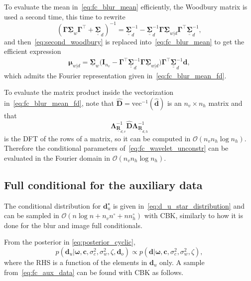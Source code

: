 \documentclass[12pt]{article}
\newcommand{\mycirc}[1] {\underline{\bm{#1}}}
\newcommand{\mybcirc}[1] {\underline{\underline{\bm{#1}}}}
\begin{document}
To evaluate the mean in~\eqref{eq:fc_blur_mean} efficiently, the Woodbury matrix is used a second time, this time to rewrite
\begin{equation} \label{eq:second_woodbury}
(\bm{\Gamma}\mycirc{\Sigma}_w\bm{\Gamma}^{\top}+\mybcirc{\Sigma}_d)^{-1} = \mybcirc{\Sigma}_d^{-1} - \mybcirc{\Sigma}_d^{-1}\bm{\Gamma}\mycirc{\Sigma}_{w|d} \bm{\Gamma}^{\top} \mybcirc{\Sigma}_d^{-1},
\end{equation}
and then~\eqref{eq:second_woodbury} is replaced into~\eqref{eq:fc_blur_mean} to get the efficient expression
\begin{align}
    \bm{\mu}_{w|d} = \mycirc{\Sigma}_w \bigl(\bm{I}_{n_v} - \bm{\Gamma}^{\top} \mybcirc{\Sigma}_d^{-1}\bm{\Gamma}\mycirc{\Sigma}_{w|d}\bigr) \bm{\Gamma}^{\top}\mybcirc{\Sigma}_d^{-1}\bm{d},
\end{align}
which admits the Fourier representation given in~\eqref{eq:fc_blur_mean_fd}.


To evaluate the matrix product inside the vectorization in~\eqref{eq:fc_blur_mean_fd}, note that $\hat{\bm{D}}=\mbox{vec}^{-1}(\hat{\bm{d}})$ is an $n_v \times n_h$ matrix and that
\[
\bm{\Lambda}_{\mycirc{R}_{d, v}}^{-1} \hat{\bm{D}}\bm{\Lambda}_{\mycirc{R}_{d, h}}^{-1}
\]
is the DFT of the rows of a matrix, so it can be computed in $\mathcal{O}(n_v n_h \log n_h)$.
Therefore the conditional parameters of~\eqref{eq:fc_wavelet_unconstr} can be evaluated in the Fourier domain in $\mathcal{O}(n_v n_h \log n_h)$.


\subsection{Full conditional for the auxiliary data} \label{ap:fc_data}

The conditional distribution for $\bm{d}_u^{\star}$ is given in~\eqref{eq:d_u_star_distribution} and can be sampled in $\mathcal{O}(n\log n + n_vn^{\circ} + n n_h^{\circ})$ with CBK, similarly to how it is done for the blur and image full conditionals.

From the posterior in \eqref{eq:posterior_cyclic}, 
\begin{equation} \label{eq:fc_aux_data}
    p(\bm{d}_u |\bm{\omega}, \bm{c}, \sigma_c^2, \sigma_w^2, \zeta, \bm{d}_o)
    \propto p(\bm{d} | \bm{\omega}, \bm{c}, \sigma_c^2, \sigma_w^2, \zeta),
\end{equation}
where the RHS is a function of the elements in $\bm{d}_u$ only. A sample from~\eqref{eq:fc_aux_data} can be found with CBK as follows. 
\end{document}
